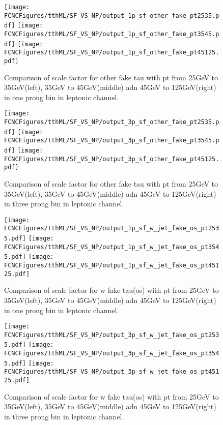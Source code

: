 \begin{figure}[H]
\centering
\texttt{[image: \\FCNCFigures/tthML/SF\_VS\_NP/output\_1p\_sf\_other\_fake\_pt2535.pdf]}	
\texttt{[image: \\FCNCFigures/tthML/SF\_VS\_NP/output\_1p\_sf\_other\_fake\_pt3545.pdf]}	
\texttt{[image: \\FCNCFigures/tthML/SF\_VS\_NP/output\_1p\_sf\_other\_fake\_pt45125.pdf]}
\\
\caption{Comparison of scale factor for other fake tau with pt from 25GeV to 35GeV(left), 35GeV to 45GeV(middle) adn 45GeV to 125GeV(right) in one prong bin in leptonic channel.}
\label{fig:1p_sf_b_fake_pt2535}
\end{figure}

\begin{figure}[H]
\centering
\texttt{[image: \\FCNCFigures/tthML/SF\_VS\_NP/output\_3p\_sf\_other\_fake\_pt2535.pdf]}
\texttt{[image: \\FCNCFigures/tthML/SF\_VS\_NP/output\_3p\_sf\_other\_fake\_pt3545.pdf]}
\texttt{[image: \\FCNCFigures/tthML/SF\_VS\_NP/output\_3p\_sf\_other\_fake\_pt45125.pdf]}
\\
\caption{Comparison of scale factor for other fake tau with pt from 25GeV to 35GeV(left), 35GeV to 45GeV(middle) adn 45GeV to 125GeV(right) in three prong bin in leptonic channel.}
\label{fig:3p_sf_b_fake_pt2535}
\end{figure}





\begin{figure}[H]
\centering
\texttt{[image: \\FCNCFigures/tthML/SF\_VS\_NP/output\_1p\_sf\_w\_jet\_fake\_os\_pt2535.pdf]}
\texttt{[image: \\FCNCFigures/tthML/SF\_VS\_NP/output\_1p\_sf\_w\_jet\_fake\_os\_pt3545.pdf]}
\texttt{[image: \\FCNCFigures/tthML/SF\_VS\_NP/output\_1p\_sf\_w\_jet\_fake\_os\_pt45125.pdf]}
\\
\caption{Comparison of scale factor for w fake tau(os) with pt from 25GeV to 35GeV(left), 35GeV to 45GeV(middle) adn 45GeV to 125GeV(right) in one prong bin in leptonic channel.}
\label{fig:1p_sf_b_fake_pt2535}
\end{figure}

\begin{figure}[H]
\centering
\texttt{[image: \\FCNCFigures/tthML/SF\_VS\_NP/output\_3p\_sf\_w\_jet\_fake\_os\_pt2535.pdf]}
\texttt{[image: \\FCNCFigures/tthML/SF\_VS\_NP/output\_3p\_sf\_w\_jet\_fake\_os\_pt3545.pdf]}
\texttt{[image: \\FCNCFigures/tthML/SF\_VS\_NP/output\_3p\_sf\_w\_jet\_fake\_os\_pt45125.pdf]}
\\
\caption{Comparison of scale factor for w fake tau(os) with pt from 25GeV to 35GeV(left), 35GeV to 45GeV(middle) adn 45GeV to 125GeV(right) in three prong bin in leptonic channel.}
\label{fig:3p_sf_b_fake_pt2535}
\end{figure}


